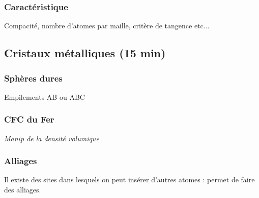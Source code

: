 \documentclass[12pt,prb,aps,epsf]{article}
\begin{document}
\subsubsection{Caractéristique}
Compacité, nombre d'atomes par maille, critère de tangence etc...

\subsection{Cristaux métalliques (15 min)}
\subsubsection{Sphères dures}
Empilements AB ou ABC

\subsubsection{CFC du Fer}
\textit{Manip de la densité volumique}

\subsubsection{Alliages}
Il existe des sites dans lesquels on peut insérer d'autres atomes : permet de faire des alliages.
	
\end{document}
